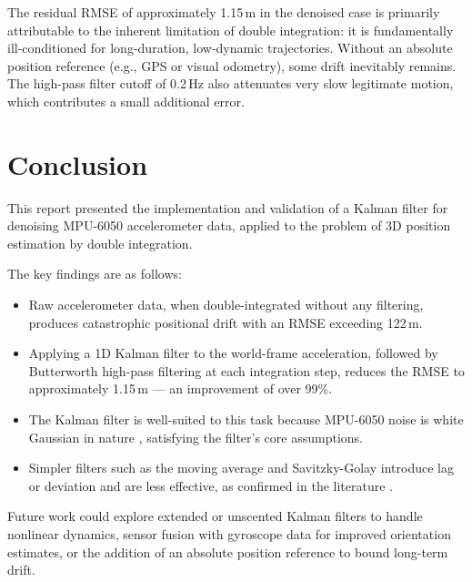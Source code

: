 \documentclass[12pt,a4paper]{article}
\begin{document}
The residual RMSE of approximately 1.15\,m in the denoised case is primarily attributable to the inherent limitation of double integration: it is fundamentally ill-conditioned for long-duration, low-dynamic trajectories. Without an absolute position reference (e.g., GPS or visual odometry), some drift inevitably remains. The high-pass filter cutoff of 0.2\,Hz also attenuates very slow legitimate motion, which contributes a small additional error.

\newpage
\section{Conclusion}

This report presented the implementation and validation of a Kalman filter for denoising MPU-6050 accelerometer data, applied to the problem of 3D position estimation by double integration.

The key findings are as follows:
\begin{itemize}
    \item Raw accelerometer data, when double-integrated without any filtering, produces catastrophic positional drift with an RMSE exceeding 122\,m.
    \item Applying a 1D Kalman filter to the world-frame acceleration, followed by Butterworth high-pass filtering at each integration step, reduces the RMSE to approximately 1.15\,m — an improvement of over 99\%.
    \item The Kalman filter is well-suited to this task because MPU-6050 noise is white Gaussian in nature \cite{nirmala2016}, satisfying the filter's core assumptions.
    \item Simpler filters such as the moving average and Savitzky-Golay introduce lag or deviation and are less effective, as confirmed in the literature \cite{nirmala2016}.
\end{itemize}

Future work could explore extended or unscented Kalman filters to handle nonlinear dynamics, sensor fusion with gyroscope data for improved orientation estimates, or the addition of an absolute position reference to bound long-term drift.
\end{document}
